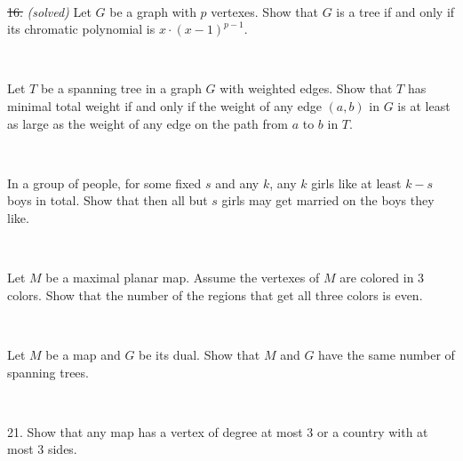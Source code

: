 \documentclass[oneside,a4paper]{article}
\begin{document}
\ 

\noindent \sout{16.} \textit{(solved)}
Let $G$ be a graph with $p$ vertexes.
Show that  $G$ is a tree if and only if
its chromatic polynomial is $x\cdot(x-1)^{p-1}$.

\ 

 Let $T$ be a spanning tree in a graph $G$ with weighted edges.
Show that $T$ has minimal total weight if and only if the weight of any edge $(a,b)$ in $G$ is at least as large as the weight of any edge on the path from $a$ to $b$ in $T$. 


\ 

 In a group of people, for some fixed $s$ and any $k$,
any $k$ girls like at least $k-s$ boys in total.
Show that then all but $s$ girls may get married on the boys they like.

\ 

Let $M$ be a maximal planar map.
Assume the vertexes of $M$ are colored in 3 colors.
Show that the number of the regions that get all three colors is even.

\ 

Let $M$ be a map and $G$ be its dual.
Show that $M$ and $G$ have the same number of spanning trees.

\ 

\noindent %
{21.} %
Show that any map has a vertex of degree at most 3 or a country with at most 3 sides.
\end{document}
